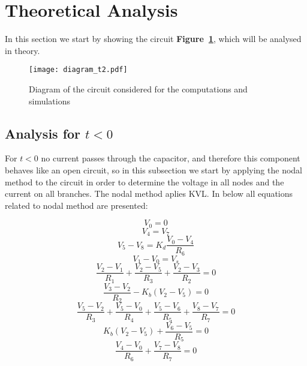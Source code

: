 \section{Theoretical Analysis}
\label{sec:analysis}

In this section we start by showing the circuit \textbf{Figure~\ref{fig:diagram_t2}}, which will be analysed in theory.

\begin{figure}[H] \centering
\texttt{[image: diagram\_t2.pdf]}
\caption{Diagram of the circuit considered for the computations and simulations}
\label{fig:diagram_t2}
\end{figure}


\subsection{Analysis for $t<0$} 
For $t<0$ no current passes through the capacitor, and therefore this component behaves like an open circuit, so in this subsection we start by applying the nodal method to the circuit in order to determine the voltage in all nodes and the current on all branches. The nodal method aplies KVL. In below all equations related to nodal method are presented: 

\begin {equation}
	V_0 = 0
	\label{eq:n1}
\end{equation}
\begin {equation}
	V_4 = V_7
	\label{eq:n2}
\end{equation}
\begin {equation}
	V_5 - V_8 = K_d \frac{V_0 - V_4}{R_6}
	\label{eq:n3}
\end{equation}
\begin {equation}
	V_1 - V_0 = V_s
	\label{eq:n4}
\end{equation}
\begin {equation}
	\frac{V_2-V_1}{R_1} + \frac{V_2 - V_5}{R_3} + \frac{V_2 - V_3}{R_2} = 0
	\label{eq:n5}
\end{equation}
\begin {equation}
	\frac{V_3-V_2}{R_2} - K_b(V_2-V_5)  = 0
	\label{eq:n6}
\end{equation}
\begin {equation}
	\frac{V_5-V_2}{R_3} + \frac{V_5-V_0}{R_4} + \frac{V_5-V_6}{R_5} + \frac{V_8-V_7}{R_7}= 0
	\label{eq:n7}
\end{equation}
\begin {equation}
	K_b(V_2-V_5) + \frac{V_6-V_5}{R_5}   = 0
	\label{eq:n8}
\end{equation}
\begin {equation}
	\frac{V_4-V_0}{R_6} + \frac{V_7 - V_8}{R_7} = 0
	\label{eq:n9}
\end{equation}



